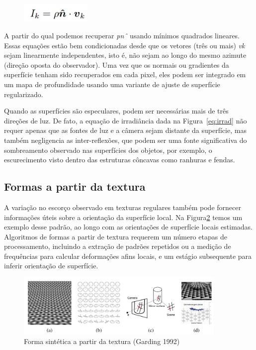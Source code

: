 \documentclass{article}
\begin{document}
\begin{figure}[!htb]
    \centering
    \includegraphics[width=0.3\textwidth]{equacao5.jpg}
    \label{eq:estereo}
\end{figure}

A partir do qual podemos recuperar \textit{pnˆ} usando mínimos quadrados lineares. Essas equações estão bem condicionadas desde que os vetores (três ou mais) \textit{vk} sejam linearmente independentes, isto é, não sejam
ao longo do mesmo azimute (direção oposta do observador). Uma vez que os normais ou gradientes da superfície tenham sido recuperados em cada pixel, eles podem ser integrado em um mapa de profundidade usando uma variante de ajuste de superfície regularizado. 

Quando as superfícies são especulares, podem ser necessárias mais de três direções de luz. De fato,
a equação de irradiância dada na Figura~\ref{eq:irrad} não requer apenas que as fontes de luz e a câmera sejam
distante da superfície, mas também negligencia as inter-reflexões, que podem ser uma fonte significativa
do sombreamento observado nas superfícies dos objetos, por exemplo, o escurecimento visto dentro das estruturas côncavas como ranhuras e fendas.

\subsection{Formas a partir da textura}

A variação no escorço observado em texturas regulares também pode fornecer informações úteis sobre a orientação da superfície local. Na Figura\ref{fig:textura} temos um exemplo desse padrão, ao longo
com as orientações de superfície locais estimadas. Algoritmos de formas a partir de textura requerem um número
etapas de processamento, incluindo a extração de padrões repetidos ou a medição de frequências para calcular deformações afins locais, e um estágio subsequente para inferir orientação de superfície.

\begin{figure}[!htb]
    \centering
    \includegraphics[width=0.9\textwidth]{imagem2.jpg}
    \caption{Forma sintética a partir da textura (Garding 1992)}
    \label{fig:textura}
\end{figure}
\end{document}
